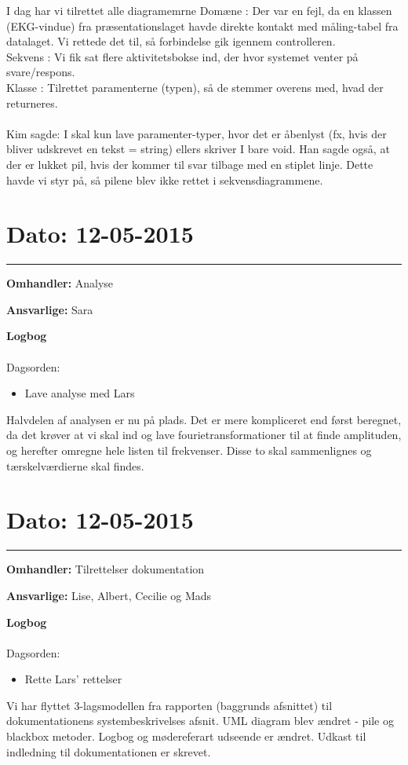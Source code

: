I dag har vi tilrettet alle diagramemrne
Domæne :  Der var en fejl, da en klassen (EKG-vindue) fra præsentationslaget havde direkte kontakt med måling-tabel fra datalaget. Vi rettede det til, så forbindelse gik igennem controlleren. 
\\
Sekvens : Vi fik sat flere aktivitetsbokse ind, der hvor systemet venter på svare/respons. 
\\
Klasse : Tilrettet paramenterne (typen), så de stemmer overens med, hvad der returneres. 
\\
\\
Kim sagde: I skal kun lave paramenter-typer, hvor det er åbenlyst (fx, hvis der bliver udskrevet en tekst = string) ellers skriver I bare void. 
Han sagde også, at der er lukket pil, hvis der kommer til svar tilbage med en stiplet linje. Dette havde vi styr på, så pilene blev ikke rettet i sekvensdiagrammene.  


\section{Dato: 12-05-2015}
\hrule
\textbf{Omhandler:} Analyse

\textbf{Ansvarlige:} Sara

\textbf{Logbog}
\\
\\
Dagsorden:
\begin{itemize}
	\item Lave analyse med Lars
\end{itemize}

Halvdelen af analysen er nu på plads. Det er mere kompliceret end først beregnet, da det krøver at vi skal ind og lave fourietransformationer til at finde amplituden, og herefter omregne hele listen til frekvenser. Disse to skal sammenlignes og tærskelværdierne skal findes. 


\section{Dato: 12-05-2015}
\hrule
\textbf{Omhandler:} Tilrettelser dokumentation

\textbf{Ansvarlige:} Lise, Albert, Cecilie og Mads

\textbf{Logbog}
\\
\\
Dagsorden:
\begin{itemize}
	\item Rette Lars' rettelser
\end{itemize}

Vi har flyttet 3-lagsmodellen fra rapporten (baggrunds afsnittet) til dokumentationens systembeskrivelses afsnit. UML diagram blev ændret - pile og blackbox metoder. Logbog og mødereferart udseende er ændret. Udkast til indledning til dokumentationen er skrevet. 